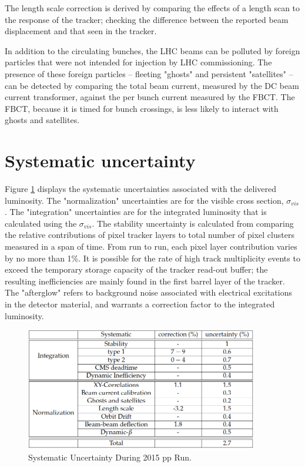 The length scale correction is derived by comparing the effects of a length scan to the response of the tracker; checking the difference between the reported beam displacement and that seen in the tracker. 

In addition to the circulating bunches, the LHC beams can be polluted by foreign particles that were not intended for injection by LHC commissioning. The presence of these foreign particles -- fleeting "ghosts" and persistent "satellites" -- can be detected by comparing the total beam current, measured by the DC beam current transformer, against the per bunch current measured by the FBCT. The FBCT, because it is timed for bunch crossings, is less likely to interact with ghosts and satellites. 

\section{Systematic uncertainty}

Figure \ref{fig:sysLumiError} displays the systematic uncertainties associated with the delivered luminosity. The "normalization" uncertainties are for the visible cross section, $\sigma_{vis}$. The "integration" uncertainties are for the integrated luminosity that is calculated using the $\sigma_{vis}$. The stability uncertainty is calculated from comparing the relative contributions of pixel tracker layers to total number of pixel clusters measured in a span of time. From run to run, each pixel layer contribution varies by no more than 1\%. It is possible for the rate of high track multiplicity events to exceed the temporary storage capacity of the tracker read-out buffer; the resulting inefficiencies are mainly found in the first barrel layer of the tracker. The "afterglow" refers to background noise associated with electrical excitations in the detector material, and warrants a correction factor to the integrated luminosity. 

\begin{figure}[h!]
\begin{centering}
\includegraphics[width=4in]{Chapter4/importfigs/CMS-PAS-LUM-15-001_Table_001.png}
\par\end{centering}
\caption{Systematic Uncertainty During 2015 pp Run. \label{fig:sysLumiError}}
\end{figure}


